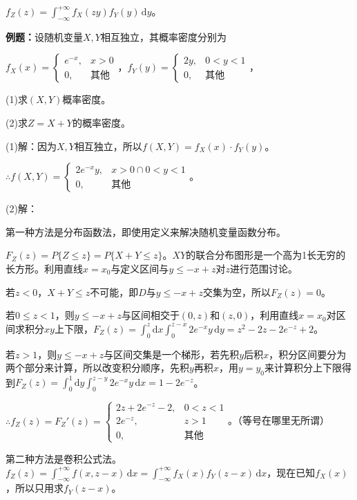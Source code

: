 \documentclass[UTF8, 12pt]{ctexart}
\begin{document}
$f_Z(z)=\int_{-\infty}^{+\infty}f_X(zy)f_Y(y)\,\textrm{d}y$。

\textbf{例题：}设随机变量$X,Y$相互独立，其概率密度分别为

$f_X(x)=\left\{\begin{array}{ll}
    e^{-x}, & x>0 \\
    0, & \text{其他} 
\end{array}\right.$，$f_Y(y)=\left\{\begin{array}{ll}
    2y, & 0<y<1 \\
    0, & \text{其他} 
\end{array}\right.$，

(1)求$(X,Y)$概率密度。

(2)求$Z=X+Y$的概率密度。

(1)解：因为$X,Y$相互独立，所以$f(X,Y)=f_X(x)\cdot f_Y(y)$。

$\therefore f(X,Y)=\left\{\begin{array}{ll}
    2e^{-x}y, & x>0\cap0<y<1 \\
    0, & \text{其他} 
\end{array}\right.$。

(2)解：

第一种方法是分布函数法，即使用定义来解决随机变量函数分布。

$F_Z(z)=P\{Z\leqslant z\}=P\{X+Y\leqslant z\}$。$XY$的联合分布图形是一个高为1长无穷的长方形。利用直线$x=x_0$与定义区间与$y\leqslant -x+z$对$z$进行范围讨论。

若$z<0$，$X+Y\leqslant z$不可能，即$D$与$y\leqslant-x+z$交集为空，所以$F_Z(z)=0$。

若$0\leqslant z<1$，则$y\leqslant -x+z$与区间相交于$(0,z)$和$(z,0)$，利用直线$x=x_0$对区间求积分$xy$上下限，$F_Z(z)=\int_0^z\textrm{d}x\int_0^{z-x}2e^{-x}y\,\textrm{d}y=z^2-2z-2e^{-z}+2$。

若$z>1$，则$y\leqslant -x+z$与区间交集是一个梯形，若先积$y$后积$x$，积分区间要分为两个部分来计算，所以改变积分顺序，先积$y$再积$x$，用$y=y_0$来计算积分上下限得到$F_Z(z)=\int_0^1\textrm{d}y\int_0^{z-y}2e^{-x}y\,\textrm{d}x=1-2e^{-z}$。

$\therefore f_Z(z)=F_Z'(z)=\left\{\begin{array}{ll}
    2z+2e^{-z}-2, & 0<z<1 \\
    2e^{-z}, & z>1 \\
    0, & \textbf{其他}
\end{array}\right.$。（等号在哪里无所谓）

第二种方法是卷积公式法。$f_Z(z)=\int_{-\infty}^{+\infty}f(x,z-x)\,\textrm{d}x=\int_{-\infty}^{+\infty}f_X(x)f_Y(z-x)\,\textrm{d}x$，现在已知$f_X(x)$，所以只用求$f_Y(z-x)$。
\end{document}
